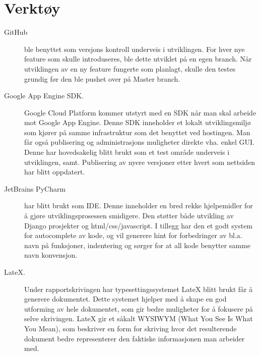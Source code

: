 \newpage
\section{Verktøy}
\begin{description}
\item[GitHub]ble benyttet som versjons kontroll underveis i utviklingen. For hver nye feature som skulle introduseres, ble dette utviklet på en egen branch. Når utviklingen av en ny feature fungerte som planlagt, skulle den testes grundig før den ble pushet over på Master branch.
\item[Google App Engine SDK.] Google Cloud Platform kommer utstyrt med en SDK når man skal arbeide mot Google App Engine. Denne SDK inneholder et lokalt utviklingsmiljø som kjører på samme infrastruktur som det benyttet ved hostingen. Man får også publisering og administrasjons muligheter direkte vha. enkel GUI. Denne har hovedsakelig blitt brukt som et test område underveis i utviklingen, samt. Publisering av nyere versjoner etter hvert som nettsiden har blitt oppdatert.
\item[JetBrains PyCharm] har blitt brukt som IDE. Denne inneholder en bred rekke hjelpemidler for å gjøre utviklingsprosessen smidigere. Den støtter både utvikling av Django prosjekter og html/css/javascript. I tillegg har den et godt system for autocomplete av kode, og vil generere hint for forbedringer av bl.a. navn på funksjoner, indentering og sørger for at all kode benytter samme navn konvensjon.
\item[LateX.]Under rapportskrivingen har typesettingssystemet LateX blitt brukt får å generere dokumentet. Dette systemet hjelper med å skape en god utforming av hele dokumentet, som gir bedre muligheter for å fokusere på selve skrivingen. LateX gir et såkalt WYSIWYM (What You See Is What You Mean), som beskriver en form for skriving hvor det resulterende dokument bedre representerer den faktiske informasjonen man arbeider med.



\end{description}

